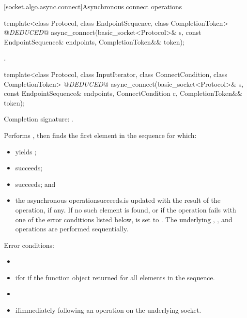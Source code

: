 [socket.algo.async.connect]{Asynchronous connect operations}

\begin{itemdecl}
template<class Protocol, class EndpointSequence, class CompletionToken>
  @\textit{DEDUCED}@ async_connect(basic_socket<Protocol>& s,
                        const EndpointSequence& endpoints,
                        CompletionToken&& token);
\end{itemdecl}

\begin{itemdescr}
\pnum
\returns {}.
\end{itemdescr}

\begin{itemdecl}
template<class Protocol, class InputIterator,
  class ConnectCondition, class CompletionToken>
    @\textit{DEDUCED}@ async_connect(basic_socket<Protocol>& s,
                          const EndpointSequence& endpoints,
                          ConnectCondition c,
                          CompletionToken&& token);
\end{itemdecl}

\begin{itemdescr}
\pnum
Completion signature: .

\pnum
\effects Performs , then finds the first element  in the sequence  for which:
\begin{itemize}
\item
{}yields ;
\item
{}succeeds;
\item
{}succeeds; and
\item
 the asynchronous operationsucceeds.is updated with the result of the operation, if any. If no such element is found, or if the operation fails with one of the error conditions listed below, is set to . \enternote The underlying , , and  operations are performed sequentially. \exitnote
\end{itemize}

\pnum
Error conditions: 
\begin{itemize}
\item
{}
\item
 ifor if the function object returned for all elements in the sequence.
\item
{}
\item
 ifimmediately following an  operation on the underlying socket.
\end{itemize}
\end{itemdescr}

